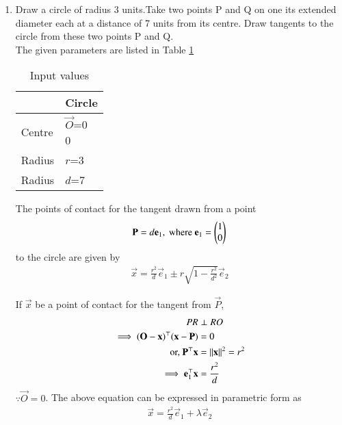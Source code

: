 \renewcommand{\theequation}{\theenumi}
\begin{enumerate}[label=\thesubsection.\arabic*.,ref=\thesubsection.\theenumi]
%
\item 
%
Draw a circle of radius 3 units.Take two points P and Q on one its extended diameter each at a distance of 7 units from its centre. Draw tangents to the circle from these two points P and Q. 
\\
\solution The given parameters are listed in Table \ref{tab:table1}
%
\begin{table}[!ht]
\begin{center}
\begin{tabular}{ | m{2cm} | m{2cm} |} 
\hline
 & Circle \\
\hline
Centre  & $\vec{O}$=\myvec{0\\0} \\ 
\hline
Radius & $r$=3  \\ 
\hline
Radius & $d$=7  \\ 
\hline
\end{tabular}
\end{center}
\caption{Input values}
\label{tab:table1}
\end{table}
%
\begin{lemma}
  \label{lemma/linman/circ/contact/final}
  The points of contact for the tangent drawn from a point 
%
\begin{align}
  \mathbf{P} = d\mathbf{e}_1, \text{ where } \mathbf{e}_1 = \begin{pmatrix}1\\0\end{pmatrix}
  \end{align}
  to the circle are given by 
  \begin{align}
    \vec{x} = \frac{r^2}{d}\vec{e}_1  \pm r\sqrt{1 - \frac{r^2}{d^2}} \vec{e}_2
    \label{linman/circ/contact/final}
   \end{align}
%   
\end{lemma}
If $\vec{x}$ be a point of contact for the tangent from $\vec{P}$, 
\begin{align}
PR &\perp RO
\\
 \implies (\mathbf{O}-\mathbf{x})^{\top} (\mathbf{x}-\mathbf{P}) &= 0
 \\
 \text{or, }  \mathbf{P}^{\top} \mathbf{x} &=\left\lVert\mathbf{x}\right\rVert^2 = r^2
 \\
 \implies \mathbf{e}_1^{\top} \mathbf{x} &= \frac{r^2}{d}
  \end{align}
  $\because \vec{O} = 0$.  The above equation can be expressed in parametric form as 
 \begin{align}
  \vec{x} = \frac{r^2}{d}\vec{e}_1 + \lambda \vec{e}_2

\end{align}
\end{enumerate}
